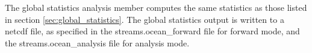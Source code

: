 The global statistics analysis member computes the same statistics as those listed in section \ref{sec:global_statistics}.  The global statistics output is written to a netcdf file, as specified in the streams.ocean\_forward file for forward mode, and the streams.ocean\_analysis file for analysis mode.

